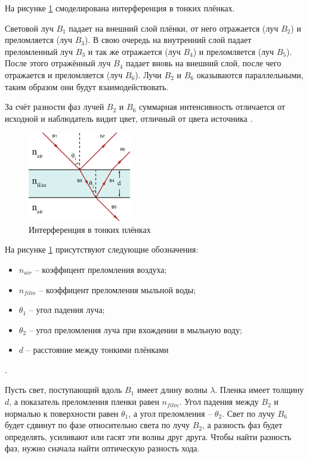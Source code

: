 На рисунке \ref{fig:interference} смоделирована интерференция в тонких плёнках.

Световой луч $B_1$ падает на внешний слой плёнки, от него отражается (луч $B_2$) и преломляется (луч $B_3$). В свою очередь на внутренний слой падает преломленный луч $B_3$ и так же отражается (луч $B_4$) и преломляется (луч $B_5$). После этого отражённый луч $B_4$ падает вновь на внешний слой, после чего отражается и преломляется (луч $B_6$). Лучи $B_2$ и $B_6$ оказываются параллельными, таким образом они будут взаимодействовать.

За счёт разности фаз лучей $B_2$ и $B_6$ суммарная интенсивность отличается от исходной и наблюдатель видит цвет, отличный от цвета источника \cite{interference}.

\begin{figure}[h]
	\centering
	\includegraphics[width=0.4\textwidth]{img/interference.png}
	\caption{Интерференция в тонких плёнках \cite{berne2000dynamic}}
	\label{fig:interference}
\end{figure}

На рисунке \ref{fig:interference} присутствуют следующие обозначения:

\begin{itemize}[label=---]
    \item $n_{air}$ -- коэффицент преломления воздуха;
    \item $n_{film}$ -- коэффицент преломления мыльной воды;
    \item $\theta_1$ -- угол падения луча;
    \item $\theta_2$ -- угол преломления луча при вхождении в мыльную воду;
    \item $d$ -- расстояние между тонкими плёнками
\end{itemize}.


Пусть свет, поступающий вдоль $B_1$ имеет длину волны $\lambda$. Пленка имеет толщину $d$, а показатель преломления пленки равен $n_{film}$. Угол падения между $B_2$ и нормалью к поверхности равен $\theta_1$, а угол преломления -- $\theta_2$. Свет по лучу $B_6$ будет сдвинут по фазе относительно света по лучу $B_2$, а разность фаз будет определять, усиливают или гасят эти волны друг друга. Чтобы найти разность фаз, нужно сначала найти оптическую разность хода.

